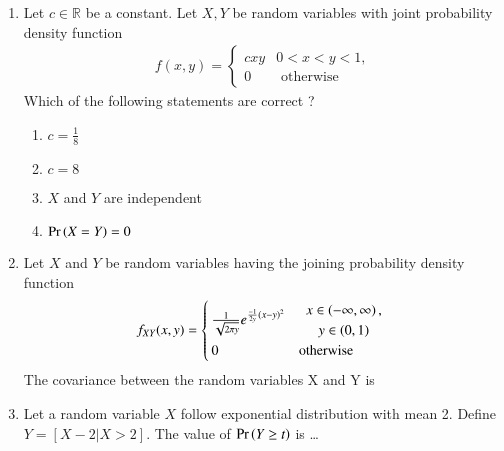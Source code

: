\renewcommand{\theequation}{\theenumi}
\renewcommand{\thefigure}{\theenumi}
\renewcommand{\thetable}{\theenumi}
\begin{enumerate}[label=\thesection.\arabic*.,ref=\thesection.\theenumi]

\item Let $ c \in \mathbb{R} $ be a constant. Let $ X, Y$ be random variables with joint probability density function 
\begin{align}
f(x,y)  = 
\begin{cases}
cxy &  0<x<y<1,
\\
0 & \text{ otherwise }
\end{cases}
\label{eq:: joint_pdf}
\end{align}
Which of the following statements are correct ?
\begin{enumerate}
    \item $c = \frac{1}{8}$
    \item $ c= 8$
    \item $X $ and $ Y$ are independent
    \item $\Pr\left(X= Y\right) = 0 $
\end{enumerate}
\solution

%
\item Let $X$ and $Y$ be random variables having the joining probability density function
\begin{align}
f_{XY}(x,y)=
\begin{cases}
\frac{1}{\sqrt{2\pi y}}e^{\frac{-1}{2y}(x-y)^2} & 
\begin{array}{c}
x \in \left(-\infty,\infty\right), 
\\
y \in \left(0, 1\right) 
\end{array}
\\
0 &\text{otherwise}
\end{cases}
\label{eq:twoD/2}
\end{align}
The covariance between the random variables X and Y is
\\
%
\solution
%
\item Let a random variable $X$ follow exponential distribution with mean 2. Define $Y=[X-2|X>2]$. The value of $\Pr\left(Y \geq t\right)$ is \dots
\\
%
\solution



\end{enumerate}